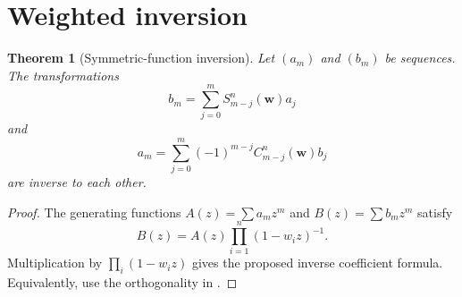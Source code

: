 \documentclass[11pt,a4paper,oneside,openany]{book}
\newtheorem{theorem}{Theorem}[chapter]
\theoremstyle{definition}
\theoremstyle{remark}
\begin{document}
\section{Weighted inversion}

\begin{theorem}[Symmetric-function inversion]\label{thm:weighted-inversion}
Let $(a_m)$ and $(b_m)$ be sequences.  The transformations
\[
 b_m=\sum_{j=0}^{m}S_{m-j}^n(\mathbf w)a_j
\]
and
\[
 a_m=\sum_{j=0}^{m}(-1)^{m-j}C_{m-j}^n(\mathbf w)b_j
\]
are inverse to each other.
\end{theorem}

\begin{proof}
The generating functions $A(z)=\sum a_mz^m$ and $B(z)=\sum b_mz^m$ satisfy
\[
 B(z)=A(z)\prod_{i=1}^{n}(1-w_i z)^{-1}.
\]
Multiplication by $\prod_i(1-w_i z)$ gives the proposed inverse coefficient formula.  Equivalently, use the orthogonality in .
\end{proof}
\end{document}
